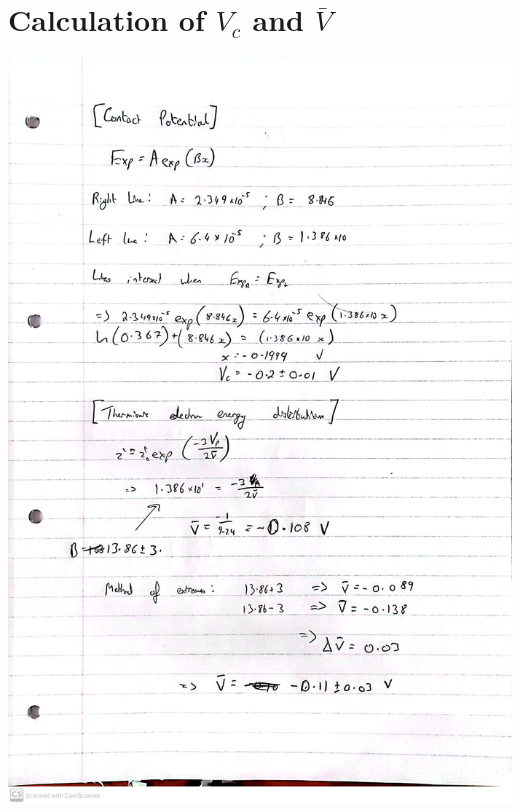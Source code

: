 \documentclass[%
reprint,
amsmath,amssymb,
aps,
floatfix
]{revtex4-2}
\begin{document}
	\section{Calculation of $V_c$ and $\bar{V}$}
	\includegraphics[width=0.9\columnwidth]{discrepancies.jpg}

	
	
\end{document}
